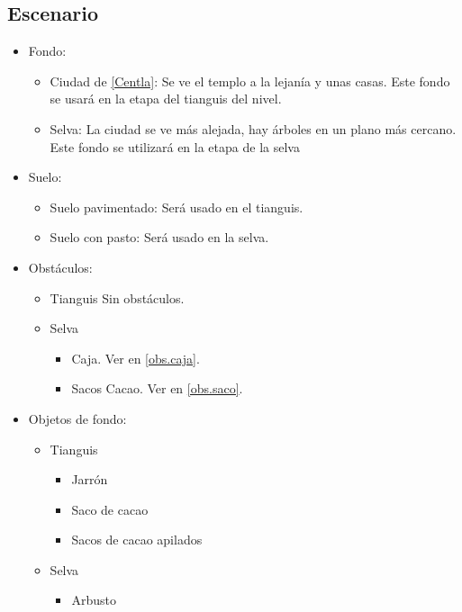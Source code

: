 \subsection{Escenario}
\begin{itemize} 
	\item Fondo:
\begin{itemize}
			\item Ciudad de \ref{Centla}: Se ve el templo a la lejanía y unas casas. Este fondo se usará en la etapa del tianguis del nivel.
			\item Selva: La ciudad se ve más alejada, hay árboles en un plano más cercano. Este fondo se utilizará en la etapa de la selva  
\end{itemize}	
	\item Suelo:
		\begin{itemize}
			\item Suelo pavimentado: Será usado en el tianguis.
			\item Suelo con pasto: Será usado en la selva.
		\end{itemize}
	\item Obstáculos:
		\begin{itemize}
			\item Tianguis
				Sin obstáculos.
			\item Selva
				\begin{itemize}
					\item Caja. Ver en \ref{obs.caja}.
					\item Sacos Cacao. Ver en \ref{obs.saco}.
				\end{itemize}
		\end{itemize}
	\item Objetos de fondo:
		\begin{itemize}
			\item Tianguis
				\begin{itemize}
					\item Jarrón
					\item Saco de cacao
					\item Sacos de cacao apilados
				\end{itemize}
			\item Selva
				\begin{itemize}
					\item Arbusto
				\end{itemize}

		\end{itemize}
\end{itemize}	
